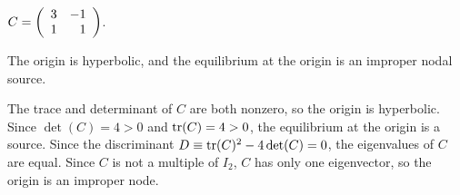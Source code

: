\documentclass{ximera}
\begin{document}
\begin{exercise}  \label{E:PQc}
$C = \left(\begin{array}{rr} 3 & -1\\ 1 &1\end{array}\right)$.

\begin{solution}
\ans The origin is hyperbolic, and the equilibrium at the origin
is an improper nodal source.

\soln The trace and determinant of $C$ are both nonzero, so the origin
is hyperbolic.  Since $\det(C) = 4 > 0$ and ${\rm tr}(C) = 4 > 0$,
the equilibrium at the origin is a source.  Since the discriminant
$D \equiv {\rm tr}(C)^2 - 4\det(C) = 0$, the eigenvalues of $C$ are equal.
Since $C$ is not a multiple of $I_2$, $C$ has only one eigenvector, so
the origin is an improper node.

\end{solution}
\end{exercise}
\end{document}
